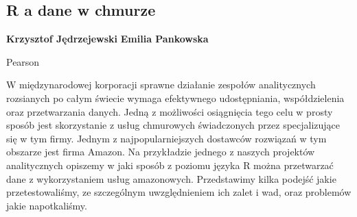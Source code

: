 \documentclass[\main/boa.tex]{subfiles}
\begin{document}
\subsection{R a dane w chmurze}

\begin{minipage}{0.915\textwidth}
	\centering
  {\bf {} Krzysztof Jędrzejewski}
    {\bf {} Emilia Pankowska}
\end{minipage}

\vskip 0.3cm

\begin{affiliations}
\begin{minipage}{0.915\textwidth}
\centering
Pearson \\[-2pt]
\end{minipage}
\end{affiliations}

\vskip 0.8cm

W międzynarodowej korporacji sprawne działanie zespołów analitycznych rozsianych po całym świecie wymaga efektywnego udostępniania, współdzielenia oraz przetwarzania danych. Jedną z możliwości osiągnięcia tego celu w prosty sposób jest skorzystanie z usług chmurowych świadczonych przez specjalizujące się w tym firmy. Jednym z najpopularniejszych dostawców rozwiązań w tym obszarze jest firma Amazon. Na przykładzie jednego z naszych projektów analitycznych opiszemy w jaki sposób z poziomu języka R można przetwarzać dane z wykorzystaniem usług amazonowych. Przedstawimy kilka podejść jakie przetestowaliśmy, ze szczególnym uwzględnieniem ich zalet i wad, oraz problemów jakie napotkaliśmy. 
\end{document}
